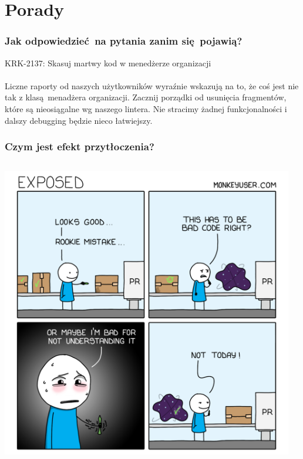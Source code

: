 \documentclass[xcolor=dvipsnames]{beamer}%
\begin{document}
\section{Porady}

\begin{frame}
	\frametitle{Jak odpowiedzieć na pytania zanim się pojawią?}
	KRK-2137: Skasuj martwy kod w menedżerze organizacji \\~\\
	Liczne raporty od naszych użytkowników wyraźnie wskazują na to,
	że coś jest nie tak z klasą menadżera organizacji. Zacznij
	porządki od usunięcia fragmentów, które są nieosiągalne wg
	naszego lintera. Nie stracimy żadnej funkcjonalności i dalszy
	debugging będzie nieco łatwiejszy.
\end{frame}

\begin{frame}
	\frametitle{Czym jest efekt przytłoczenia?}
	\begin{columns}
		\begin{column}{0.5\textwidth}
			\includegraphics[width=\textwidth,height=\textheight,keepaspectratio]{figure/exposed.png}
		\end{column}
		\begin{column}{0.5\textwidth}

\end{column}
\end{columns}
\end{frame}
\end{document}
